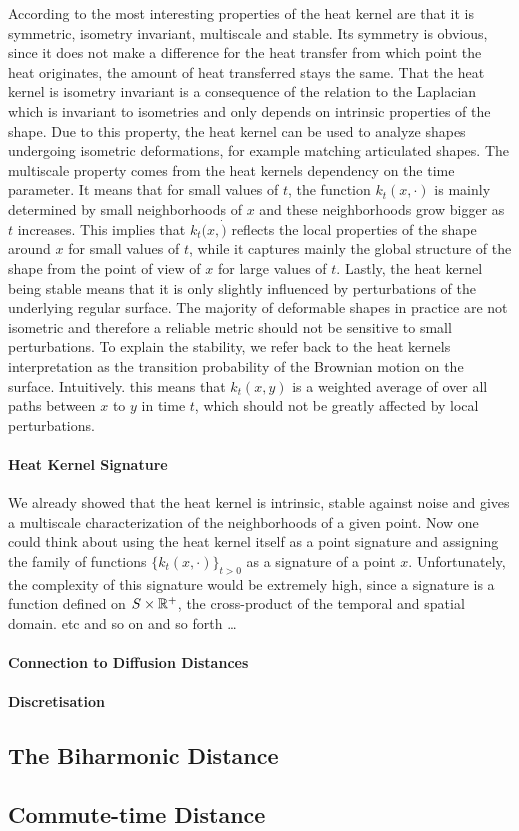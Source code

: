 According to \cite{sun2009concise} the most interesting properties of the heat kernel are that it is symmetric, isometry invariant, multiscale and stable.
Its symmetry is obvious, since it does not make a difference for the heat transfer from which point the heat originates, the amount of heat transferred stays the same.
That the heat kernel is isometry invariant is a consequence of the relation to the Laplacian which is invariant to isometries and only depends on intrinsic properties of the shape.
Due to this property, the heat kernel can be used to analyze shapes undergoing isometric deformations, for example matching articulated shapes.
The multiscale property comes from the heat kernels dependency on the time parameter.
It means that for small values of $t$, the function $k_t(x,\cdot)$ is mainly determined by small neighborhoods of $x$ and these neighborhoods grow bigger as $t$ increases.
This implies that $k_t(x,\dot)$ reflects the local properties of the shape around $x$ for small values of $t$, while it captures mainly the global structure of the shape from the point of view of $x$ for large values of $t$.
Lastly, the heat kernel being stable means that it is only slightly influenced by perturbations of the underlying regular surface.
The majority of deformable shapes in practice are not isometric and therefore a reliable metric should not be sensitive to small perturbations.
To explain the stability, we refer back to the heat kernels  interpretation as the transition probability of the Brownian motion on the surface.
Intuitively. this means that $k_t(x,y)$ is a weighted average of over all paths between $x$ to $y$ in time $t$, which should not be greatly affected by local perturbations.

\paragraph{Heat Kernel Signature}
We already showed that the  heat kernel is intrinsic, stable against noise and gives a multiscale characterization of the neighborhoods of a given point.
Now one could think about using the heat kernel itself as a point signature and assigning the family of functions $\{k_t(x,\cdot)\}_{t>0}$ as a signature of a point $x$.
Unfortunately, the complexity of this signature would be extremely high, since a signature is a function defined on $S \times \mathbb{R}^+$, the cross-product of the temporal and spatial domain.
etc and so on and so forth \ldots
\paragraph{Connection to Diffusion Distances}
\paragraph{Discretisation}

\subsection{The Biharmonic Distance}
\subsection{Commute-time Distance}
